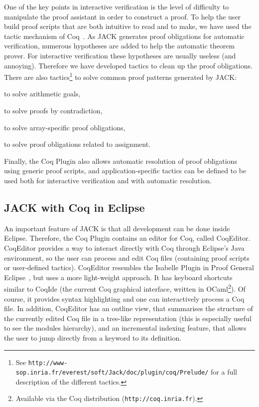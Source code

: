 One of the key points in interactive verification is the level of
difficulty to manipulate the proof assistant in order to construct a
proof.  To help the user build proof scripts that are both intuitive
to read and to make, we have used the tactic mechanism of
Coq~\cite{DEL-00-LTAC}.  As JACK generates proof obligations for
automatic verification, numerous hypotheses are added to help the
automatic theorem prover. For interactive verification these
hypotheses are usually useless (and annoying). Therefore we have
developed tactics to clean up the proof obligations. There are also
tactics\footnote{ See
\texttt{http://www-sop.inria.fr/everest/soft/Jack/doc/plugin/coq/Prelude/}
for a full description of the different tactics.}  to solve common
proof patterns generated by JACK: 
\begin{inparaenum}
\item to solve arithmetic goals,
\item to solve proofs by contradiction,
\item to solve array-specific proof obligations,
\item to solve proof obligations related to assignment.
\end{inparaenum}
Finally, the Coq Plugin also allows automatic resolution of proof
obligations using generic proof scripts, and application-specific
tactics can be defined to be used both for interactive verification
and with automatic resolution.



\subsection{JACK with Coq in Eclipse}

An important feature of JACK is that all development can be done
inside Eclipse.  Therefore, the Coq Plugin contains an editor for Coq,
called CoqEditor. CoqEditor provides a way to interact directly with
Coq through Eclipse's Java environment, so the user can process and
edit Coq files (containing proof scripts or user-defined tactics).
CoqEditor resembles the Isabelle Plugin in Proof General
Eclipse~\cite{WintersteinAL05}, but uses a more light-weight approach.
It has keyboard shortcuts similar to CoqIde (the current Coq graphical
interface, written in OCaml\footnote{Available via the Coq
distribution (\texttt{http://coq.inria.fr}).}). Of course, it provides
syntax highlighting and one can interactively process a Coq file.  In
addition, CoqEditor has an outline view, that summarises the structure
of the currently edited Coq file in a tree-like representation (this
is especially useful to see the modules hierarchy), and an incremental
indexing feature, that allows the user to jump directly from a keyword
to its definition.

